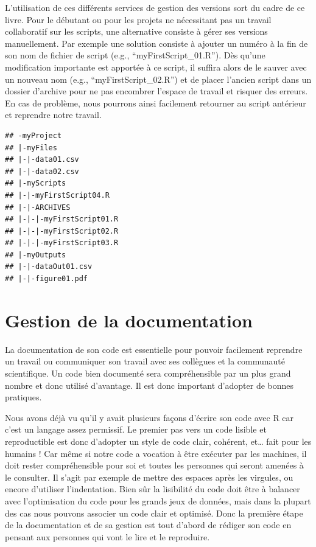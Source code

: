 \documentclass[twoside,symmetric]{book}
\begin{document}
L'utilisation de ces différents services de gestion des versions sort du cadre de ce livre. Pour le débutant ou pour les projets ne nécessitant pas un travail collaboratif sur les scripts, une alternative consiste à gérer ses versions manuellement. Par exemple une solution consiste à ajouter un numéro à la fin de son nom de fichier de script (e.g., ``myFirstScript\_01.R''). Dès qu'une modification importante est apportée à ce script, il suffira alors de le sauver avec un nouveau nom (e.g., ``myFirstScript\_02.R'') et de placer l'ancien script dans un dossier d'archive pour ne pas encombrer l'espace de travail et risquer des erreurs. En cas de problème, nous pourrons ainsi facilement retourner au script antérieur et reprendre notre travail.

\begin{verbatim}
## -myProject
## |-myFiles
## |-|-data01.csv
## |-|-data02.csv
## |-myScripts
## |-|-myFirstScript04.R
## |-|-ARCHIVES
## |-|-|-myFirstScript01.R
## |-|-|-myFirstScript02.R
## |-|-|-myFirstScript03.R
## |-myOutputs
## |-|-dataOut01.csv
## |-|-figure01.pdf
\end{verbatim}

\hypertarget{gestion-de-la-documentation}{%
\section{Gestion de la documentation}\label{gestion-de-la-documentation}}

La documentation de son code est essentielle pour pouvoir facilement reprendre un travail ou communiquer son travail avec ses collègues et la communauté scientifique. Un code bien documenté sera compréhensible par un plus grand nombre et donc utilisé d'avantage. Il est donc important d'adopter de bonnes pratiques.

Nous avons déjà vu qu'il y avait plusieurs façons d'écrire son code avec R car c'est un langage assez permissif. Le premier pas vers un code lisible et reproductible est donc d'adopter un style de code clair, cohérent, et\ldots{} fait pour les humains ! Car même si notre code a vocation à être exécuter par les machines, il doit rester compréhensible pour soi et toutes les personnes qui seront amenées à le consulter. Il s'agit par exemple de mettre des espaces après les virgules, ou encore d'utiliser l'indentation. Bien sûr la lisibilité du code doit être à balancer avec l'optimisation du code pour les grands jeux de données, mais dans la plupart des cas nous pouvons associer un code clair et optimisé. Donc la première étape de la documentation et de sa gestion est tout d'abord de rédiger son code en pensant aux personnes qui vont le lire et le reproduire.
\end{document}
